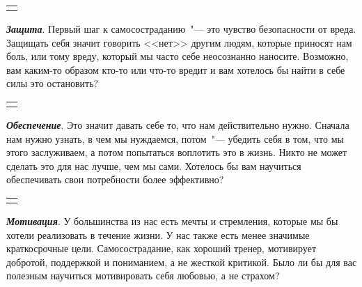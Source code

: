 \setlength{\extrarowheight}{2mm}
\begin{tabularx}{\textwidth}{X}
	\\
	\arrayrulecolor{gray}\hline\\
	\hline\\
\end{tabularx}
\setlength{\extrarowheight}{0mm}

\vspace{3ex}


\begin{itemize}
	\itemyinyang \textit{\textbf{Защита}}. Первый шаг к самосостраданию~"--- это чувство безопасности от вреда. Защищать себя значит говорить <<нет>> другим людям, которые приносят нам боль, или тому вреду, который мы часто себе неосознанно наносите. Возможно, вам каким-то образом кто-то или что-то вредит и вам хотелось бы найти в себе силы это остановить? 
\end{itemize}

\setlength{\extrarowheight}{2mm}
\begin{tabularx}{\textwidth}{X}
	\\
	\arrayrulecolor{gray}\hline\\
	\hline\\
\end{tabularx}
\setlength{\extrarowheight}{0mm}
\begin{itemize}
	\itemyinyang \textit{\textbf{Обеспечение}}. Это значит давать себе то, что нам действительно нужно. Сначала нам нужно узнать, в чем мы нуждаемся, потом~"--- убедить себя в том, что мы этого заслуживаем, а потом попытаться воплотить это в жизнь. Никто не может сделать это для нас лучше, чем мы сами. Хотелось бы вам научиться обеспечивать свои потребности более эффективно?
\end{itemize}

\setlength{\extrarowheight}{2mm}
\begin{tabularx}{\textwidth}{X}
	\\
	\arrayrulecolor{gray}\hline\\
	\hline\\
\end{tabularx}
\setlength{\extrarowheight}{0mm}
\begin{itemize}
	\itemyinyang \textit{\textbf{Мотивация}}. У большинства из нас есть мечты и стремления, которые мы бы хотели реализовать в течение жизни. У нас также есть менее значимые краткосрочные цели. Самосострадание, как хороший тренер, мотивирует добротой, поддержкой и пониманием, а не жесткой критикой. Было ли бы для вас полезным научиться мотивировать себя любовью, а не страхом? 
\end{itemize}

